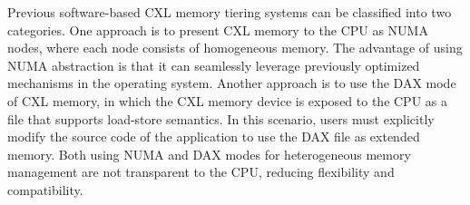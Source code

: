 \vspace{5pt}
\noindent{}
\vspace{5pt}



Previous software-based CXL memory tiering systems can be classified into two categories.
One approach is to present CXL memory to the CPU as NUMA nodes, where each node consists of homogeneous memory. The advantage of using NUMA abstraction is that it can seamlessly leverage previously optimized mechanisms in the operating system.
Another approach is to use the DAX mode of CXL memory, in which the CXL memory device is exposed to the CPU as a file that supports load-store semantics. In this scenario, users must explicitly modify the source code of the application to use the DAX file as extended memory. 
Both using NUMA and DAX modes for heterogeneous memory management are not transparent to the CPU, reducing flexibility and compatibility.

